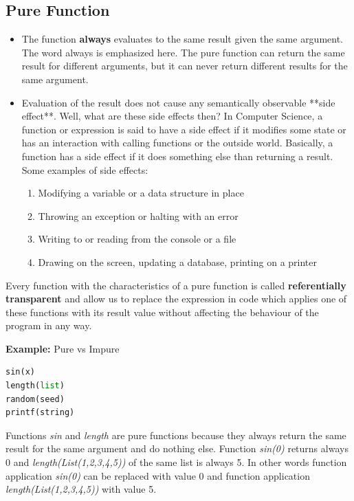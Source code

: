 \documentclass[12pt,twoside,a4paper]{report}
\begin{document}
\subsection{Pure Function}\label{6.4.1}

\begin{itemize}\itemsep1pt \parskip0pt 
\item The function \textbf{always} evaluates to the same result given the same argument. The word always is emphasized here. The pure function can return the same result for different arguments, but it can never return different results for the same argument.
\item Evaluation of the result does not cause any semantically observable **side effect**. Well, what are these side effects then? In Computer Science, a function or expression is said to have a side effect if it modifies some state or has an interaction with calling functions or the outside world. Basically, a function has a side effect if it does something else than returning a result. Some examples of side effects:
	\begin{enumerate}\itemsep1pt \parskip0pt 
	\item Modifying a variable or a data structure in place
	\item Throwing an exception or halting with an error
	\item Writing to or reading from the console or a file
	\item Drawing on the screen, updating a database, printing on a printer
	\end{enumerate}
\end{itemize}

Every function with the characteristics of a pure function is called \textbf{referentially transparent} and allow us to replace the expression in code which applies one of these functions with its result value without affecting the behaviour of the program in any way.

\textbf{Example:} Pure vs Impure
\begin{lstlisting}[language=python]
sin(x)
length(list)
random(seed)
printf(string)
\end{lstlisting}
Functions \emph{sin} and \emph{length} are pure functions because they always return the same result for the same argument and do nothing else. Function \emph{sin(0)} returns always 0 and \emph{length(List(1,2,3,4,5))} of the same list is always 5. In other words function application \emph{sin(0)} can be replaced with value 0 and function application \emph{length(List(1,2,3,4,5))} with value 5.
\end{document}
